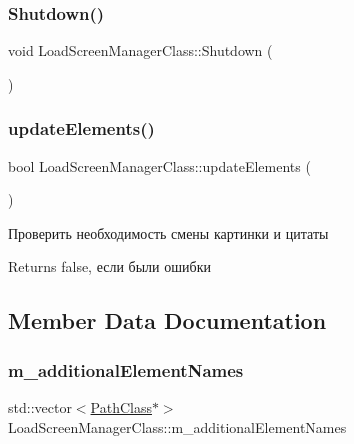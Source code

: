 \subsubsection{\texorpdfstring{Shutdown()}{Shutdown()}}
{\footnotesize\ttfamily void Load\+Screen\+Manager\+Class\+::\+Shutdown (\begin{DoxyParamCaption}{ }\end{DoxyParamCaption})}

\mbox{\label{class_load_screen_manager_class_a244ce822d442e75c3a98e19460fce0a4}} 
\subsubsection{\texorpdfstring{update\+Elements()}{updateElements()}}
{\footnotesize\ttfamily bool Load\+Screen\+Manager\+Class\+::update\+Elements (\begin{DoxyParamCaption}{ }\end{DoxyParamCaption})\hspace{0.3cm}{\ttfamily [private]}}



Проверить необходимость смены картинки и цитаты 

\begin{DoxyReturn}{Returns}
false, если были ошибки 
\end{DoxyReturn}


\subsection{Member Data Documentation}
\mbox{\label{class_load_screen_manager_class_a007ed034708915f51438d7e11b66a43a}} 
\subsubsection{\texorpdfstring{m\+\_\+additional\+Element\+Names}{m\_additionalElementNames}}
{\footnotesize\ttfamily std\+::vector$<$\hyperlink{class_path_class}{Path\+Class}$\ast$$>$ Load\+Screen\+Manager\+Class\+::m\+\_\+additional\+Element\+Names\hspace{0.3cm}{\ttfamily [private]}}



